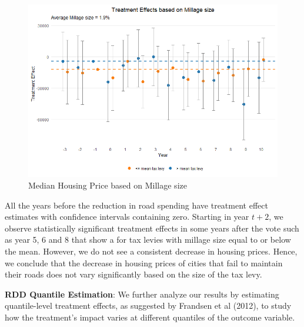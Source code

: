 \begin{figure}[htbp]
    \centering
    \includegraphics[width=\textwidth,keepaspectratio]{images/tes_size_re.png}    
    \caption{Median Housing Price based on Millage size}
    \label{fig:tes_covs_size}
\end{figure}

All the years before the reduction in road spending have treatment effect estimates with confidence intervals containing zero. Starting in year $t+2$, we observe statistically significant treatment effects in some years after the vote such as year 5, 6 and 8 that show a for tax levies with millage size equal to or below the mean. However, we do not see a consistent decrease in housing prices. Hence, we conclude that the decrease in housing prices of cities that fail to maintain their roads does not vary significantly based on the size of the tax levy.

\vskip 1cm

\textbf{RDD Quantile Estimation}: We further analyze our results by estimating quantile-level treatment effects, as suggested by Frandsen et al (2012), to study how the treatment’s impact varies at different quantiles of the outcome variable. 

